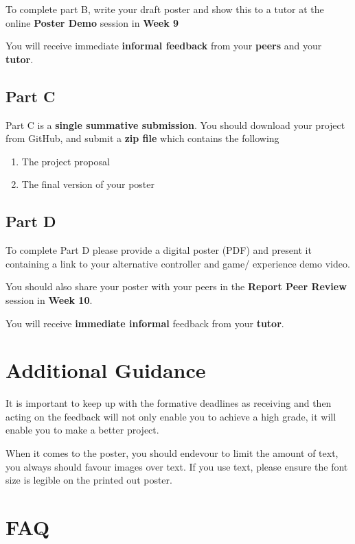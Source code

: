 \documentclass{../../fal_assignment}
\begin{document}
To complete part B, write your draft poster and show this to a tutor at the online \textbf{Poster Demo} session in \textbf{Week 9}

You will receive immediate \textbf{informal feedback} from your \textbf{peers} and your \textbf{tutor}.

\subsection*{Part C}

Part C is a \textbf{single summative submission}. You should download your project from GitHub, and submit a \textbf{zip file} which contains the following

	\begin{enumerate}
	\item The project proposal
	\item The final version of your poster
	\end{enumerate}

\subsection*{Part D}

	To complete Part D please provide a digital poster (PDF) and present it containing a link to your alternative controller and game/ experience demo video.
	
	You should also share your poster with your peers in the \textbf{Report Peer Review} session in \textbf{Week 10}. 

	You will receive \textbf{immediate informal} feedback from your \textbf{tutor}.

\section*{Additional Guidance}
It is important to keep up with the formative deadlines as receiving and then acting on the feedback 
will not only enable you to achieve a high grade, it will enable you to make a better project. 

When it comes to the poster, you should endevour to limit the amount of text, 
you always should favour images over text. If you use text, please ensure the 
font size is legible on the printed out poster.

\section*{FAQ}
\end{document}
